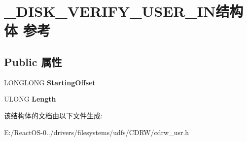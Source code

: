 \hypertarget{struct___d_i_s_k___v_e_r_i_f_y___u_s_e_r___i_n}{}\section{\+\_\+\+D\+I\+S\+K\+\_\+\+V\+E\+R\+I\+F\+Y\+\_\+\+U\+S\+E\+R\+\_\+\+I\+N结构体 参考}
\label{struct___d_i_s_k___v_e_r_i_f_y___u_s_e_r___i_n}
\subsection*{Public 属性}
\begin{DoxyCompactItemize}
\item 
\mbox{\label{struct___d_i_s_k___v_e_r_i_f_y___u_s_e_r___i_n_a2e48f4c4c1b1121145e54832c81e3c00}} 
L\+O\+N\+G\+L\+O\+NG {\bfseries Starting\+Offset}
\item 
\mbox{\label{struct___d_i_s_k___v_e_r_i_f_y___u_s_e_r___i_n_ade05ce885773d0da2e22e114161ca216}} 
U\+L\+O\+NG {\bfseries Length}
\end{DoxyCompactItemize}


该结构体的文档由以下文件生成\+:\begin{DoxyCompactItemize}
\item 
E\+:/\+React\+O\+S-\/0../drivers/filesystems/udfs/\+C\+D\+R\+W/cdrw\+\_\+usr.\+h\end{DoxyCompactItemize}
